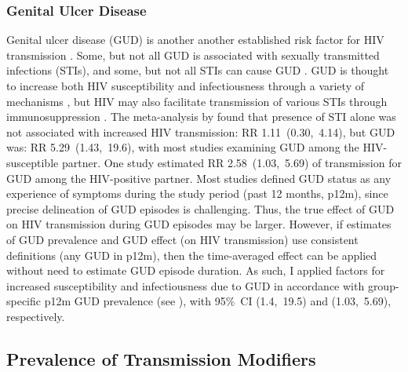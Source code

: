 \subsubsection{Genital Ulcer Disease}\label{model.par.beta.gud}
Genital ulcer disease (GUD)
is another another established risk factor for HIV transmission \cite{Plummer1991,Fleming1999}.
Some, but not all GUD is associated with sexually transmitted infections (STIs),
and some, but not all STIs can cause GUD \cite{Fleming1999}.
GUD is thought to increase both HIV susceptibility and infectiousness
through a variety of mechanisms \cite{Fleming1999,Sheffield2007,Fox2010},
but HIV may also facilitate transmission of various STIs
through immunosuppression \cite{Wasserheit1992}.
The meta-analysis by \citet{Boily2009} found that
presence of STI alone was not associated with increased HIV transmission: RR 1.11~(0.30,~4.14),
but GUD was: RR 5.29~(1.43,~19.6),
with most studies examining GUD among the HIV-susceptible partner.
One study \cite{Gray2001} estimated RR 2.58~(1.03,~5.69) of transmission
for GUD among the HIV-positive partner.
Most studies defined GUD status as any experience of symptoms during the study period
(\eg past 12 months, p12m),
since precise delineation of GUD episodes is challenging.
Thus, the true effect of GUD on HIV transmission during GUD episodes may be larger.
However, if estimates of GUD prevalence and GUD effect (on HIV transmission)
use consistent definitions (\eg any GUD in p12m),
then the time-averaged effect can be applied without need to estimate GUD episode duration.
As such, I applied factors for increased susceptibility and infectiousness due to GUD
in accordance with group-specific p12m GUD prevalence (see ),
with 95\%~CI (1.4,~19.5) and (1.03,~5.69), respectively.
\subsection{Prevalence of Transmission Modifiers}\label{model.par.tm}
